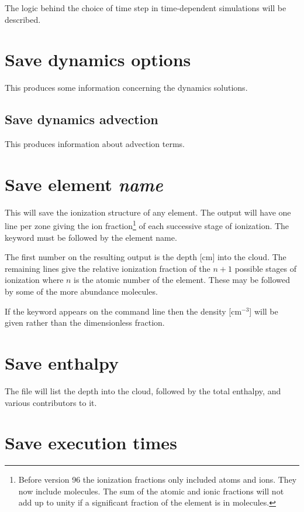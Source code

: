 The logic behind the choice of time step in time-dependent simulations will be described.

\section{Save dynamics options}

This produces some information concerning the dynamics solutions.

\subsection{Save dynamics advection}

This produces information about advection terms.

\section{Save element \emph{name}}

This will save the ionization structure of any element. The output will
have one line per zone giving the ion fraction\footnote{Before version 96 the ionization fractions only included atoms and
ions.  They now include molecules.  The sum of the atomic and ionic fractions
will not add up to unity if a significant fraction of the element is in
molecules.} of each successive stage
of ionization.  The keyword  must be followed by the element name.

The first number on the resulting output is the depth [cm] into the cloud.
The remaining lines give the relative ionization fraction of the $n+1$ possible
stages of ionization where $n$ is the atomic number of the element.  These
may be followed by some of the more abundance molecules.

If the keyword  appears on the command line then the
density [cm$^{-3}$]
will be given rather than the dimensionless fraction.

\section{Save enthalpy}

The file will list the depth into the cloud, followed by the total
enthalpy, and various contributors to it.

\section{Save execution times}

